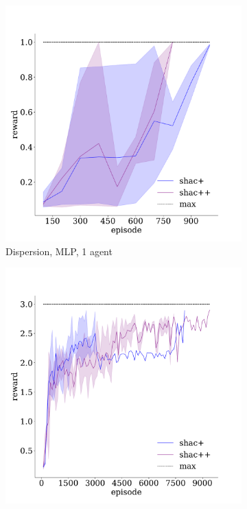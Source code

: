 \begin{figure}[!t]
    \centering
    \begin{subfigure}[b]{0.30\textwidth}
        \includegraphics[width=\textwidth]{figs/dispersion-ablation-1-mlp.pdf}
        \caption{Dispersion, MLP, 1 agent}
        \label{fig:dispersion-ablation-mlp-1}
    \end{subfigure}
    \begin{subfigure}[b]{0.30\textwidth}
        \includegraphics[width=\textwidth]{figs/dispersion-ablation-3-transformer.pdf}

\end{subfigure}
\end{figure}
